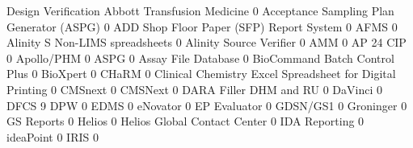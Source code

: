 \documentclass{article}
\begin{document}
\begin{Schunk}
\begin{Soutput}
                                                            Design Verification
  Abbott Transfusion Medicine                                                 0
  Acceptance Sampling Plan Generator (ASPG)                                   0
  ADD Shop Floor Paper (SFP) Report System                                    0
  AFMS                                                                        0
  Alinity S Non-LIMS spreadsheets                                             0
  Alinity Source Verifier                                                     0
  AMM                                                                         0
  AP 24 CIP                                                                   0
  Apollo/PHM                                                                  0
  ASPG                                                                        0
  Assay File Database                                                         0
  BioCommand Batch Control Plus                                               0
  BioXpert                                                                    0
  CHaRM                                                                       0
  Clinical Chemistry Excel Spreadsheet for Digital Printing                   0
  CMSnext                                                                     0
  CMSNext                                                                     0
  DARA Filler DHM and RU                                                      0
  DaVinci                                                                     0
  DFCS                                                                        9
  DPW                                                                         0
  EDMS                                                                        0
  eNovator                                                                    0
  EP Evaluator                                                                0
  GDSN/GS1                                                                    0
  Groninger                                                                   0
  GS Reports                                                                  0
  Helios                                                                      0
  Helios Global Contact Center                                                0
  IDA Reporting                                                               0
  ideaPoint                                                                   0
  IRIS                                                                        0

\end{Soutput}
\end{Schunk}
\end{document}
